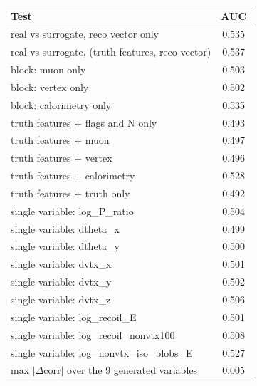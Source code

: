 \begin{tabular}{lc}
\toprule
Test & AUC \\
\midrule
real vs surrogate, reco vector only & 0.535 \\
real vs surrogate, (truth features, reco vector) & 0.537 \\
\midrule
block: muon only & 0.503 \\
block: vertex only & 0.502 \\
block: calorimetry only & 0.535 \\
truth features + flags and N only & 0.493 \\
truth features + muon & 0.497 \\
truth features + vertex & 0.496 \\
truth features + calorimetry & 0.528 \\
truth features + truth only & 0.492 \\
single variable: log\_P\_ratio & 0.504 \\
single variable: dtheta\_x & 0.499 \\
single variable: dtheta\_y & 0.500 \\
single variable: dvtx\_x & 0.501 \\
single variable: dvtx\_y & 0.502 \\
single variable: dvtx\_z & 0.506 \\
single variable: log\_recoil\_E & 0.501 \\
single variable: log\_recoil\_nonvtx100 & 0.508 \\
single variable: log\_nonvtx\_iso\_blobs\_E & 0.527 \\
\midrule
max $|\Delta$corr$|$ over the 9 generated variables & 0.005 \\
\bottomrule
\end{tabular}

